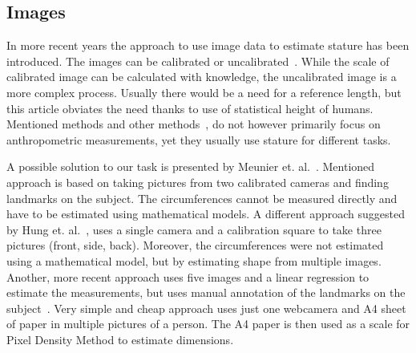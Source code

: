 \subsection{Images}

In more recent years the approach to use image data to estimate stature has been introduced. The images can be calibrated or uncalibrated~\cite{estimationImages, image}. While the scale of calibrated image can be calculated with knowledge, the uncalibrated image is a more complex process. Usually there would be a need for a reference length, but this article obviates the need thanks to use of statistical height of humans. Mentioned methods and other methods~\cite{image2}, do not however primarily focus on anthropometric measurements, yet they usually use stature for different tasks. 

A possible solution to our task is presented by Meunier et. al.~\cite{image2DMeasurements}. Mentioned approach is based on taking pictures from two calibrated cameras and finding landmarks on the subject. The circumferences cannot be measured directly and have to be estimated using mathematical models. A different approach suggested by Hung et. al.~\cite{image2DMeasurements2}, uses a single camera and a calibration square to take three pictures (front, side, back). Moreover, the circumferences were not estimated using a mathematical model, but by estimating shape from multiple images.  Another, more recent approach uses five images and a linear regression to estimate the measurements, but uses manual annotation of the landmarks on the subject~\cite{images}. Very simple and cheap approach uses just one webcamera and A4 sheet of paper in multiple pictures of a person. The A4 paper is then used as a scale for Pixel Density Method to estimate dimensions.

